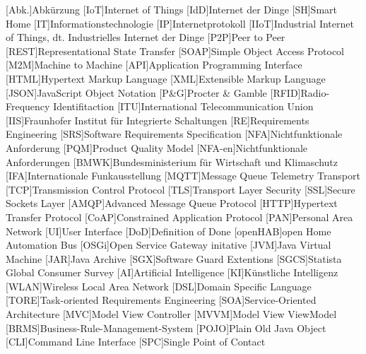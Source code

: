 \begin{acronym}[DHBW]
 [Abk.]{Abkürzung}
 [IoT]{Internet of Things}
 [IdD]{Internet der Dinge}
 [SH]{Smart Home}
 [IT]{Informationstechnologie}
 [IP]{Internetprotokoll}
 [IIoT]{Industrial Internet of Things, dt. Industrielles Internet der Dinge}
 [P2P]{Peer to Peer} 
 [REST]{Representational State Transfer}
 [SOAP]{Simple Object Access Protocol}
 [M2M]{Machine to Machine}
 [API]{Application Programming Interface}
 [HTML]{Hypertext Markup Language}
 [XML]{Extensible Markup Language}
 [JSON]{JavaScript Object Notation}
 [P\&G]{Procter \& Gamble}
 [RFID]{Radio-Frequency Identifitaction}
 [ITU]{International Telecommunication Union}
 [IIS]{Fraunhofer Institut für Integrierte Schaltungen}
 [RE]{Requirements Engineering}
 [SRS]{Software Requirements Specification}
 [NFA]{Nichtfunktionale Anforderung}
 [PQM]{Product Quality Model}
 [NFA-en]{Nichtfunktionale Anforderungen}
 [BMWK]{Bundesministerium für Wirtschaft und Klimaschutz}
 [IFA]{Internationale Funkausstellung}
 [MQTT]{Message Queue Telemetry Transport}
 [TCP]{Transmission Control Protocol}
 [TLS]{Transport Layer Security}
 [SSL]{Secure Sockets Layer}
 [AMQP]{Advanced Message Queue Protocol} 
 [HTTP]{Hypertext Transfer Protocol}
 [CoAP]{Constrained Application Protocol}
 [PAN]{Personal Area Network} 
 [UI]{User Interface}
 [DoD]{Definition of Done}
 [openHAB]{open Home Automation Bus}
 [OSGi]{Open Service Gateway initative}
 [JVM]{Java Virtual Machine}
 [JAR]{Java Archive}
 [SGX]{Software Guard Extentions}
 [SGCS]{Statista Global Consumer Survey}
 [AI]{Artificial Intelligence}
 [KI]{Künstliche Intelligenz}
 [WLAN]{Wireless Local Area Network} 
 [DSL]{Domain Specific Language}
 [TORE]{Task-oriented Requirements Engineering}
 [SOA]{Service-Oriented Architecture}
 [MVC]{Model View Controller}
 [MVVM]{Model View ViewModel}
 [BRMS]{Business-Rule-Management-System}
 [POJO]{Plain Old Java Object}
 [CLI]{Command Line Interface}
 [SPC]{Single Point of Contact}


\end{acronym}
